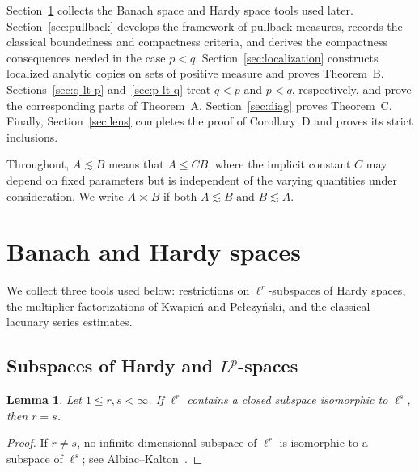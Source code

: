 \documentclass[10pt,a4paper]{amsart}
\newtheorem{lemma}[theorem]{Lemma}
\begin{document}
Section~\ref{sec:prelim}
collects the Banach space and Hardy space tools used later.
Section~\ref{sec:pullback} develops the framework of pullback measures,
records the classical boundedness and compactness criteria, and derives
the compactness consequences needed in the case \(p<q\). Section~\ref{sec:localization} constructs
localized analytic copies on sets of positive measure and proves
Theorem~B. Sections~\ref{sec:q-lt-p} and~\ref{sec:p-lt-q}
treat \(q<p\) and \(p<q\), respectively, and prove the corresponding
parts of Theorem~A. Section~\ref{sec:diag} proves Theorem~C.
Finally, Section~\ref{sec:lens} completes the proof of
Corollary~D and proves its strict inclusions.

Throughout, \(A\lesssim B\) means that \(A\le CB\), where the implicit constant \(C\) may depend on fixed parameters but is independent of the varying quantities under consideration.  We write
\(A\asymp B\) if both \(A\lesssim B\) and \(B\lesssim A\).



\section{Banach and Hardy spaces}
\label{sec:prelim}

We collect three tools used below: restrictions on
\(\ell^r\)-subspaces of Hardy spaces, the multiplier factorizations
of Kwapie\'n and Pe{\l}czy\'nski, and the classical lacunary series
estimates.
 

\subsection{\texorpdfstring{Subspaces of Hardy and \(L^p\)-spaces} 
{Subspaces of Hardy and Lp-spaces}}

\begin{lemma}
\label{lem:ellr-rigidity}
Let \(1\le r,s<\infty\). If \(\ell^r\) contains a closed subspace
isomorphic to \(\ell^s\), then \(r=s\).
\end{lemma}

\begin{proof}
If \(r\ne s\), no infinite-dimensional subspace of \(\ell^r\) is
isomorphic to a subspace of \(\ell^s\); see
Albiac--Kalton~\cite[Corollary~2.1.6]{AlbiacKalton2016}.
\end{proof}
\end{document}
